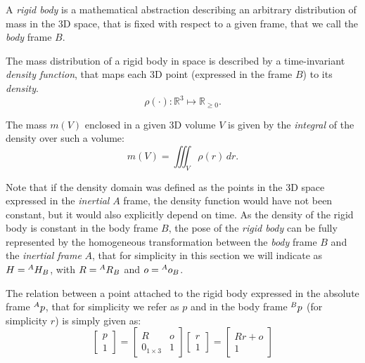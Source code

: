 \begin{definition}
A \emph{rigid body} is a mathematical abstraction describing an arbitrary distribution of mass in the 3D space, that is fixed with respect to a given frame, that we call the \emph{body} frame $B$. 
\end{definition}

\begin{definition}
The mass distribution of a rigid body in space is described by a time-invariant \emph{density function}, that maps each 3D point (expressed in the frame $B$) to its \emph{density}. 
\begin{equation}
\rho(\cdot): \mathbb{R}^3 \mapsto \mathbb{R}_{\ge 0} .
\end{equation}

The mass $m(V)$ enclosed in a given 3D volume $V$ is given by the \emph{integral} of the density over such a volume:
\begin{equation} 
m(V) = \iiint_{V} \rho\left( r \right) \, dr . 
\end{equation}
\end{definition}

Note that if the density domain was defined as the points in the 3D space expressed in the \emph{inertial} $A$ frame, the density function would have not been constant, but it would also explicitly depend on time. As the density of the rigid body is constant in the body frame $B$, the pose of the \emph{rigid body} can be fully represented by the homogeneous transformation between the \emph{body} frame $B$ and the \emph{inertial frame} $A$, that for simplicity in this section we will indicate as $H = \hspace{0em}^A H_B$, with $R = \hspace{0em}^A R_B$ and $o = \hspace{0em}^A o_B$.

The relation between a point attached to the rigid body expressed in the absolute frame $\hspace{0em}^A p$, that for simplicity we refer as $p$ and in the body frame $\hspace{0em}^B p$ (for simplicity $r$) is simply given as:
\begin{equation}
\begin{bmatrix}
  p \\
  1
\end{bmatrix}
= 
\begin{bmatrix}
  R & o \\
  0_{1\times3} & 1 
\end{bmatrix}
\begin{bmatrix}
  r \\
  1
\end{bmatrix}
= 
\begin{bmatrix}
R r + o \\ 
1
\end{bmatrix}
\end{equation}

